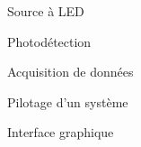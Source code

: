 \item[\textsc{\scriptsize [Phys]}] Source à LED
\item[\textsc{\scriptsize [Phys]}] Photodétection
\item[\textsc{\scriptsize [Num]}] Acquisition de données
\item[\textsc{\scriptsize [Num]}] Pilotage d'un système
\item[\textsc{\scriptsize [Num]}] Interface graphique